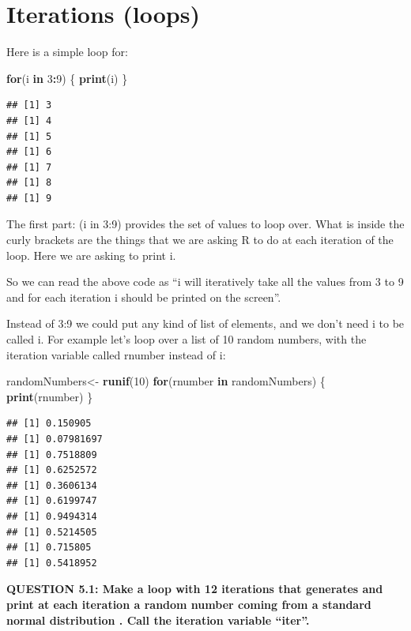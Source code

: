 \documentclass[]{book}
\newenvironment{Shaded}{\begin{snugshade}}{\end{snugshade}}
\newcommand{\ControlFlowTok}[1]{\textcolor[rgb]{0.13,0.29,0.53}{\textbf{#1}}}
\newcommand{\DecValTok}[1]{\textcolor[rgb]{0.00,0.00,0.81}{#1}}
\newcommand{\KeywordTok}[1]{\textcolor[rgb]{0.13,0.29,0.53}{\textbf{#1}}}
\newcommand{\NormalTok}[1]{#1}
\newcommand{\OperatorTok}[1]{\textcolor[rgb]{0.81,0.36,0.00}{\textbf{#1}}}
\newcommand{\StringTok}[1]{\textcolor[rgb]{0.31,0.60,0.02}{#1}}
\begin{document}
\hypertarget{iterations-loops}{%
\section{Iterations (loops)}\label{iterations-loops}}

Here is a simple loop for:

\begin{Shaded}
\begin{Highlighting}[]
\ControlFlowTok{for}\NormalTok{(i }\ControlFlowTok{in} \DecValTok{3}\OperatorTok{:}\DecValTok{9}\NormalTok{) \{}
  \KeywordTok{print}\NormalTok{(i)}
\NormalTok{\}}
\end{Highlighting}
\end{Shaded}

\begin{verbatim}
## [1] 3
## [1] 4
## [1] 5
## [1] 6
## [1] 7
## [1] 8
## [1] 9
\end{verbatim}

The first part: (i in 3:9) provides the set of values to loop over. What is inside the curly brackets are the things that we are asking R to do at each iteration of the loop. Here we are asking to print i.

So we can read the above code as ``i will iteratively take all the values from 3 to 9 and for each iteration i should be printed on the screen''.

Instead of 3:9 we could put any kind of list of elements, and we don't need i to be called i. For example let's loop over a list of 10 random numbers, with the iteration variable called rnumber instead of i:

\begin{Shaded}
\begin{Highlighting}[]
\NormalTok{randomNumbers<-}\StringTok{ }\KeywordTok{runif}\NormalTok{(}\DecValTok{10}\NormalTok{)}
\ControlFlowTok{for}\NormalTok{(rnumber }\ControlFlowTok{in}\NormalTok{ randomNumbers) \{}
  \KeywordTok{print}\NormalTok{(rnumber)}
\NormalTok{\}}
\end{Highlighting}
\end{Shaded}

\begin{verbatim}
## [1] 0.150905
## [1] 0.07981697
## [1] 0.7518809
## [1] 0.6252572
## [1] 0.3606134
## [1] 0.6199747
## [1] 0.9494314
## [1] 0.5214505
## [1] 0.715805
## [1] 0.5418952
\end{verbatim}

\textbf{QUESTION 5.1: Make a loop with 12 iterations that generates and print at each iteration a random number coming from a standard normal distribution . Call the iteration variable ``iter''.}
\end{document}
